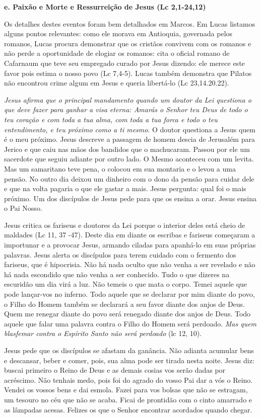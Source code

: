 \documentclass[
]{book}
\begin{document}
\textbf{e. Paixão e Morte e Ressurreição de Jesus (Lc 2,1-24,12)}

Os detalhes destes eventos foram bem detalhados em Marcos. Em Lucas listamos alguns pontos relevantes: como ele morava em Antioquia, governada pelos romanos, Lucas procura demonstrar que os cristãos convivem com os romanos e não perde a oportunidade de elogiar os romanos: cita o oficial romano de Cafarnaum que teve seu empregado curado por Jesus dizendo: ele merece este favor pois estima o nosso povo (Lc 7,4-5). Lucas também demonstra que Pilatos não encontrou crime algum em Jesus e queria libertá-lo (Lc 23,14.20.22).

\emph{Jesus afirma que o principal mandamento quando um doutor da Lei questiona o que deve fazer para ganhar a visa eterna: Amarás o Senhor teu Deus de todo o teu coração e com toda a tua alma, com toda a tua forca e todo o teu entendimento, e teu próximo como a ti mesmo}. O doutor questiona a Jesus quem é o meu próximo. Jesus descreve a passagem de homem descia de Jerusalém para Jerico e que caiu nas mãos dos bandidos que o machucaram. Passou por ele um sacerdote que seguiu adiante por outro lado. O Mesmo aconteceu com um levita. Mas um samaritano teve pena, o colocou em sua montaria e o levou a uma pensão. No outro dia deixou um dinheiro com o dono da pensão para cuidar dele e que na volta pagaria o que ele gastar a mais. Jesus pergunta: qual foi o mais próximo. Um dos discípulos de Jesus pede para que os ensina a orar. Jesus ensina o Pai Nosso.

Jesus critica os fariseus e doutores da Lei porque o interior deles está cheio de maldades (Lc 11, 37 -47). Deste dia em diante os escribas e fariseus começaram a importunar e a provocar Jesus, armando ciladas para apanhá-lo em suas próprias palavras. Jesus alerta os discípulos para terem cuidado com o fermento dos fariseus, que é hipocrisia. Não há nada oculto que não venha a ser revelado e não há nada escondido que não venha a ser conhecido. Tudo o que dizeres na escuridão um dia virá a luz. Não temeis o que mata o corpo. Temei aquele que pode lançar-vos no inferno. Todo aquele que se declarar por mim diante do povo, o Filho do Homem também se declarará a seu favor diante dos anjos de Deus. Quem me renegar diante do povo será renegado diante dos anjos de Deus. Todo aquele que falar uma palavra contra o Filho do Homem será perdoado. \emph{Mas quem blasfemar contra o Espírito Santo não será perdoado} (lc 12, 10).

Jesus pede que os discípulos se afastam da ganância. Não adianta acumular bens e descansar, beber e comer, pois, sua alma pode ser tirada nesta noite. Jesus diz: buscai primeiro o Reino de Deus e as demais cosias vos serão dadas por acréscimo. Não tenhais medo, pois foi do agrado do vosso Pai dar a vós o Reino. Vendei os vossos bens e dai esmola. Fazei para vos bolsas que não se estragam, um tesouro no céu que não se acaba. Ficai de prontidão com o cinto amarrado e as lâmpadas acesas. Felizes os que o Senhor encontrar acordados quando chegar.
\end{document}
